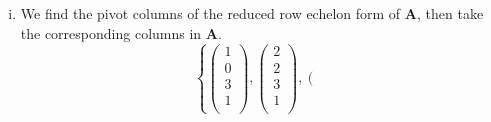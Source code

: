 \documentclass{article}
\newcommand{\bs}[1]{\boldsymbol{#1}}
\begin{document}
\begin{enumerate}[(i)]
$$\begin{array}{c}
    -3 \\
    \end{array}\right),
    \left(\begin{array}{c}
    0 \\
    0 \\
    0 \\
    0 \\
    0 \\
    1 \\
    \end{array}\right),
    \left(\begin{array}{c}
    0 \\
    0 \\
    0 \\
    1 \\
    0 \\
    0 \\
    \end{array}\right),
    \left(\begin{array}{c}
    0 \\
    0 \\
    1 \\
    0 \\
    0 \\
    0 \\
    \end{array}\right)
    \right\}.$$
    Note: The 3 vectors are chosen such that if those 3 vectors are added as rows to the original matrix, none of them reduce to the zero vector. This is done by placing ones in the positions corresponding to the location of the non-pivot columns in the RREF of the original matrix (i.e., 3, 4, and 6). 
    \item We find the pivot columns of the reduced row echelon form of $\bs{A}$, then take the corresponding columns in $\bs{A}$.
    $$\left\{ 
    \left(\begin{array}{c}
    1 \\
    0 \\
    3 \\
    1 \\
    \end{array}\right), \left(\begin{array}{c}
    2 \\
    2 \\
    3 \\
    1 \\
    \end{array}\right),
    \left(\begin{array}{c}

\end{array}$$
\end{enumerate}
\end{document}
